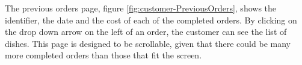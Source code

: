 The previous orders page, figure \ref{fig:customer-PreviousOrders}, shows the identifier, the date and the cost of each of the completed orders. By clicking on the drop down arrow on the left of an order, the customer can see the list of dishes. This page is designed to be scrollable, given that there could be many more completed orders than those that fit the screen.